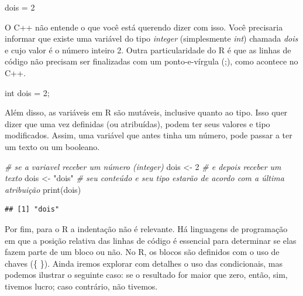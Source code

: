\documentclass[
]{book}
\newenvironment{Shaded}{\begin{snugshade}}{\end{snugshade}}
\newcommand{\CommentTok}[1]{\textcolor[rgb]{0.56,0.35,0.01}{\textit{#1}}}
\newcommand{\DecValTok}[1]{\textcolor[rgb]{0.00,0.00,0.81}{#1}}
\newcommand{\FunctionTok}[1]{\textcolor[rgb]{0.00,0.00,0.00}{#1}}
\newcommand{\NormalTok}[1]{#1}
\newcommand{\OtherTok}[1]{\textcolor[rgb]{0.56,0.35,0.01}{#1}}
\newcommand{\StringTok}[1]{\textcolor[rgb]{0.31,0.60,0.02}{#1}}
\begin{document}
\begin{Shaded}
\begin{Highlighting}[]
\NormalTok{dois }\OtherTok{=} \DecValTok{2}
\end{Highlighting}
\end{Shaded}

O C++ não entende o que você está querendo dizer com isso. Você precisaria informar que existe uma variável do tipo \emph{integer} (simplesmente \emph{int}) chamada \emph{dois} e cujo valor é o número inteiro 2. Outra particularidade do R é que as linhas de código não precisam ser finalizadas com um ponto-e-vírgula (;), como acontece no C++.

\begin{Shaded}
\begin{Highlighting}[]
\NormalTok{int dois }\OtherTok{=} \DecValTok{2}\NormalTok{;}
\end{Highlighting}
\end{Shaded}

Além disso, as variáveis em R são mutáveis, inclusive quanto ao tipo. Isso quer dizer que uma vez definidas (ou atribuídas), podem ter seus valores e tipo modificados. Assim, uma variável que antes tinha um número, pode passar a ter um texto ou um booleano.

\begin{Shaded}
\begin{Highlighting}[]
\CommentTok{\# se a variavel receber um número (integer)}
\NormalTok{dois }\OtherTok{\textless{}{-}} \DecValTok{2}
\CommentTok{\# e depois receber um texto}
\NormalTok{dois }\OtherTok{\textless{}{-}} \StringTok{"dois"}
\CommentTok{\# seu conteúdo e seu tipo estarão de acordo com a última atribuição}
\FunctionTok{print}\NormalTok{(dois)}
\end{Highlighting}
\end{Shaded}

\begin{verbatim}
## [1] "dois"
\end{verbatim}

Por fim, para o R a indentação não é relevante. Há linguagens de programação em que a posição relativa das linhas de código é essencial para determinar se elas fazem parte de um bloco ou não. No R, os blocos são definidos com o uso de chaves (\{ \}). Ainda iremos explorar com detalhes o uso das condicionais, mas podemos ilustrar o seguinte caso: se o resultado for maior que zero, então, sim, tivemos lucro; caso contrário, não tivemos.
\end{document}
